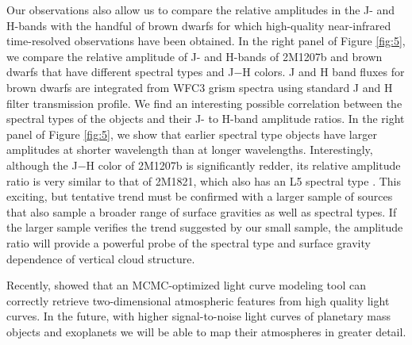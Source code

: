 \documentclass[apj]{emulateapj}
\newcommand{\revise}[1]{\textbf{{\color{cyan}{#1}}}}
\renewcommand{\revise}{}
\begin{document}
Our observations also allow us to compare the relative amplitudes in
the J- and H-bands with the handful of brown dwarfs for which
high-quality near-infrared time-resolved observations have been
obtained. In the right panel of Figure \ref{fig:5}, we compare the
relative amplitude of J- and H-bands of 2M1207b and brown dwarfs
\citep{Apai2013,Buenzli2012,Buenzli2015,Yang2015} that have different
spectral types and J$-$H colors.  J and H band fluxes for brown dwarfs
are integrated from WFC3 grism spectra using standard J and H filter
transmission profile. We find an interesting possible correlation
between the spectral types of the objects and their J- to H-band
amplitude ratios. In the right panel of Figure \ref{fig:5}, we show
that earlier spectral type objects have larger amplitudes at shorter
wavelength than at longer wavelengths. Interestingly, although the
J$-$H color of 2M1207b is significantly redder, its relative amplitude
ratio is very similar to that of 2M1821, which also has an L5 spectral
type \citep{Yang2015}.  This exciting, but tentative trend must be
confirmed with a larger sample of sources that also sample a broader
range of surface gravities as well as spectral types.  If the larger
sample verifies the trend suggested by our small sample, the amplitude
ratio will provide a powerful probe of the spectral type and surface
gravity dependence of vertical cloud structure.



\revise{Recently, \citet{Karalidi2015} showed that an MCMC-optimized
  light curve modeling tool can correctly retrieve two-dimensional
  atmospheric features from high quality light curves. In the future,
  with higher signal-to-noise light curves of planetary mass objects
  and exoplanets we will be able to map their atmospheres in greater
  detail.}


\end{document}
